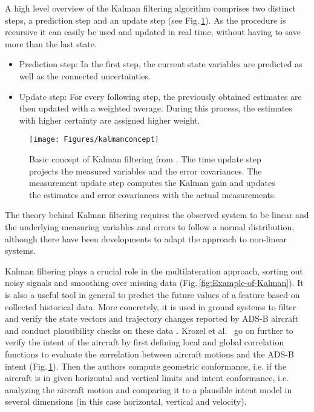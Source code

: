 \documentclass[english]{IEEEtran}
\begin{document}
A high level overview of the Kalman filtering algorithm comprises
two distinct steps, a prediction step and an update step (see Fig.\,\ref{fig:Basic-concept-ofKalman}).
As the procedure is recursive it can easily be used and updated in
real time, without having to save more than the last state. 
\begin{itemize}
\item Prediction step: In the first step, the current state variables are
predicted as well as the connected uncertainties.\emph{ }
\item Update step:\emph{ }For every following step,\emph{ }the previously
obtained estimates are then updated with a weighted average. During
this process, the estimates with higher certainty are assigned higher
weight.\emph{ }
\end{itemize}
\begin{figure}
\begin{centering}
\texttt{[image: Figures/kalmanconcept]}
\par\end{centering}

\caption{Basic concept of Kalman filtering from \cite{Welch1995}. The time
update step projects the measured variables and the error covariances.
The measurement update step computes the Kalman gain and updates the
estimates and error covariances with the actual measurements. \label{fig:Basic-concept-ofKalman}}
\end{figure}


The theory behind Kalman filtering requires the observed system to
be linear and the underlying measuring variables and errors to follow
a normal distribution, although there have been developments to adapt
the approach to non-linear systems.\emph{ }

Kalman filtering plays a crucial role in the multilateration approach,
sorting out noisy signals and smoothing over missing data (Fig.\,\ref{fig:Example-of-Kalman}).
It is also a useful tool in general to predict the future values of
a feature based on collected historical data.\emph{ }More concretely,
it is used in ground systems to filter and verify the state vectors
and trajectory changes reported by ADS-B aircraft and conduct plausibility
checks on these data \cite{Fox2003}\emph{.} Krozel et al.~\cite{Krozel2004}
go on further to verify the intent of the aircraft by first defining
local and global correlation functions to evaluate the correlation
between aircraft motions and the ADS-B intent (Fig.\,\ref{fig:Basic-concept-ofKalman}).
Then the authors compute geometric conformance, i.e. if the aircraft
is in given horizontal and vertical limits and intent conformance,
i.e. analyzing the aircraft motion and comparing it to a plausible
intent model in several dimensions (in this case horizontal, vertical
and velocity).
\end{document}
